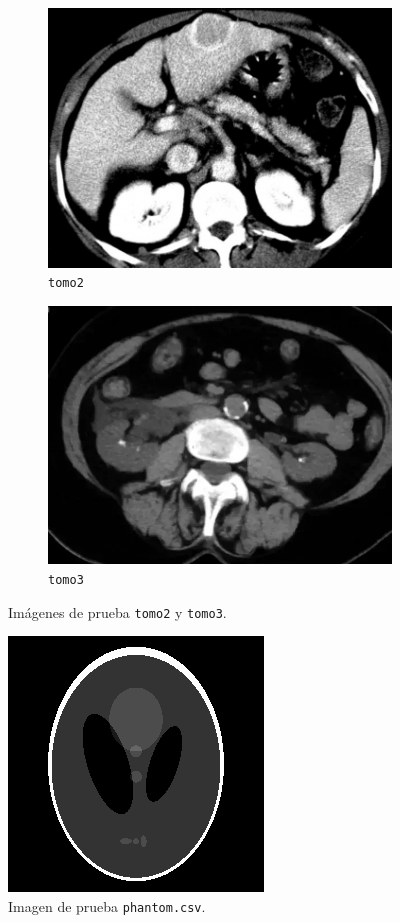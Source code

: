 \documentclass[a4paper]{article}
\begin{document}
\begin{figure}
\centering
\begin{subfigure}{0.5\textwidth}
  \centering
  \includegraphics[width=0.8\linewidth]{tomo2}
  \caption{\texttt{tomo2}}
  \label{fig:sub1}
\end{subfigure}%
\begin{subfigure}{0.5\textwidth}
  \centering
  \includegraphics[width=0.8\linewidth]{tomo3}
  \caption{\texttt{tomo3}}
  \label{fig:sub2}
\end{subfigure}
\caption{Imágenes de prueba \texttt{tomo2} y \texttt{tomo3}.}
\label{fig:tomo23}
\end{figure}

\begin{figure}
\centering
\includegraphics[width=0.3\linewidth]{phantom}
\caption{Imagen de prueba \texttt{phantom.csv}.}
\label{fig:phantom}
\end{figure}
\end{document}
